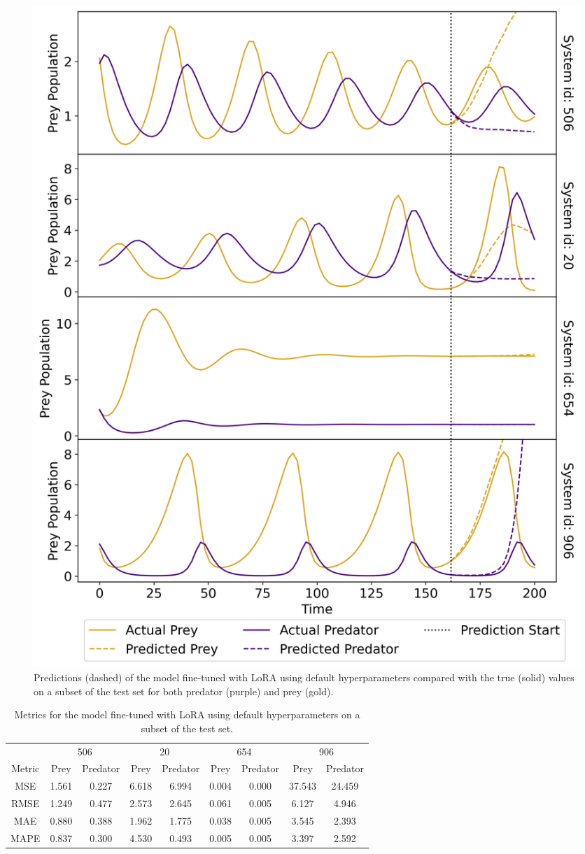 \documentclass[11pt,a4paper]{article}
\begin{document}
\begin{figure}
    \centering
    \includegraphics[width=\columnwidth, keepaspectratio]{../plots/predictions_lora_default.png}
    \caption{Predictions (dashed) of the model fine-tuned with LoRA using default hyperparameters compared with the true (solid) values on a subset of the test set for both predator (purple) and prey (gold).}
    \label{fig:lora_default_pred}
\end{figure}
\clearpage
\begin{table}
    \centering
    \begin{tabular}{c|c|c|c|c|c|c|c|c}
        & \multicolumn{2}{c|}{506} & \multicolumn{2}{c|}{20} & \multicolumn{2}{c|}{654} & \multicolumn{2}{|c}{906} \\
        Metric & Prey & Predator & Prey & Predator & Prey & Predator & Prey & Predator \\
        \hline
        MSE & 1.561 & 0.227 & 6.618 & 6.994 & 0.004 & 0.000 & 37.543 & 24.459 \\
        RMSE & 1.249 & 0.477 & 2.573 & 2.645 & 0.061 & 0.005 & 6.127 & 4.946 \\
        MAE & 0.880 & 0.388 & 1.962 & 1.775 & 0.038 & 0.005 & 3.545 & 2.393 \\
        MAPE & 0.837 & 0.300 & 4.530 & 0.493 & 0.005 & 0.005 & 3.397 & 2.592 \\
    \end{tabular}
    \caption{Metrics for the model fine-tuned with LoRA using default hyperparameters on a subset of the test set.}
    \label{tab:lora_default_metrics}
\end{table}
\end{document}

